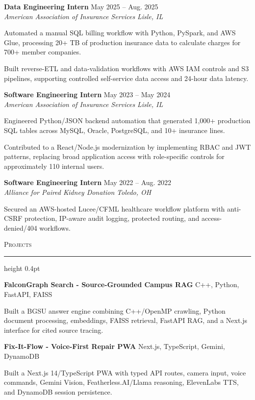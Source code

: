 \documentclass[letterpaper,11pt]{article}
\newcommand{\resumesection}[1]{%
  \par\vspace{2pt}%
  {\large\scshape #1}\par\vspace{2pt}%
  \hrule height 0.4pt\vspace{2pt}%
}
\newcommand{\resumeSubheading}[4]{
  \textbf{#1} \hfill #2\\
  \textit{#3} \hfill \textit{#4}
}
\newcommand{\projectHeading}[2]{
  \textbf{#1} \hfill #2
}
\begin{document}
\resumeSubheading
{Data Engineering Intern}{May 2025 -- Aug. 2025}
{American Association of Insurance Services}{Lisle, IL}
\begin{tightitemize}
  \item Automated a manual SQL billing workflow with Python, PySpark, and AWS Glue, processing 20+ TB of production insurance data to calculate charges for 700+ member companies.
  \item Built reverse-ETL and data-validation workflows with AWS IAM controls and S3 pipelines, supporting controlled self-service data access and 24-hour data latency.
\end{tightitemize}

\resumeSubheading
{Software Engineering Intern}{May 2023 -- May 2024}
{American Association of Insurance Services}{Lisle, IL}
\begin{tightitemize}
  \item Engineered Python/JSON backend automation that generated 1,000+ production SQL tables across MySQL, Oracle, PostgreSQL, and 10+ insurance lines.
  \item Contributed to a React/Node.js modernization by implementing RBAC and JWT patterns, replacing broad application access with role-specific controls for approximately 110 internal users.
\end{tightitemize}

\resumeSubheading
{Software Engineering Intern}{May 2022 -- Aug. 2022}
{Alliance for Paired Kidney Donation}{Toledo, OH}
\begin{tightitemize}
  \item Secured an AWS-hosted Lucee/CFML healthcare workflow platform with anti-CSRF protection, IP-aware audit logging, protected routing, and access-denied/404 workflows.
\end{tightitemize}

\resumesection{Projects}
\projectHeading{FalconGraph Search - Source-Grounded Campus RAG}{C++, Python, FastAPI, FAISS}
\begin{tightitemize}
  \item Built a BGSU answer engine combining C++/OpenMP crawling, Python document processing, embeddings, FAISS retrieval, FastAPI RAG, and a Next.js interface for cited source tracing.
\end{tightitemize}

\projectHeading{Fix-It-Flow - Voice-First Repair PWA}{Next.js, TypeScript, Gemini, DynamoDB}
\begin{tightitemize}
  \item Built a Next.js 14/TypeScript PWA with typed API routes, camera input, voice commands, Gemini Vision, Featherless.AI/Llama reasoning, ElevenLabs TTS, and DynamoDB session persistence.
\end{tightitemize}
\end{document}
